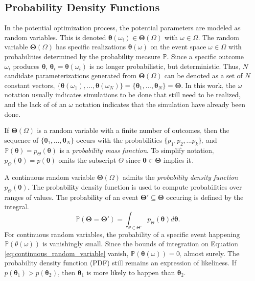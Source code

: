 \subsection{Probability Density Functions}

In the potential optimization process, the potential parameters are modeled as random variables.  This is denoted $\bm{\theta}(\omega_i) \in \bm{\Theta}(\Omega)$ with $\omega \in \Omega$.  The random variable $\bm{\Theta}(\Omega)$ has specific realizations $\bm{\theta}(\omega)$ on the event space $\omega \in \Omega$ with probabilities determined by the probability measure $\mathbb{P}$.
Since a specific outcome $\omega_i$ produces $\bm{\theta}$, $\bm{\theta}_i=\bm{\theta}(\omega_i)$ is no longer probabilistic, but deterministic.  Thus, $N$ candidate parameterizations generated from $\bm{\Theta}(\Omega)$ can be denoted as a set of $N$ constant vectors,
$
 \{\bm{\theta}(\omega_1),...,\bm{\theta}(\omega_N)\}
=\{\bm{\theta}_1,...,\bm{\theta}_N\}
=\bm{\Theta}
$.  In this work, the $\omega$ notation usually indicates simulations to be done that still need to be realized, and the lack of of an $\omega$ notation indicates that the simulation have already been done.

If $\bm{\Theta}(\Omega)$ is a random variable with a finite number of outcomes, then the sequence of $\{\bm{\theta}_1,...,\bm{\theta}_N\}$ occurs with the probabilities $\{p_1,p_2,...p_k\}$, and $\mathbb{P}(\bm{\theta})=p_{\Theta}(\bm{\theta})$ is a \emph{probability mass function}.
To simplify notation, $p_\Theta(\bm{\theta})=p(\bm{\theta})$ omits the subscript $\Theta$ since $\bm{\theta}\in\bm{\Theta}$ implies it.

A continuous random variable $\bm{\Theta}(\Omega)$ admits the \emph{probability density function} $p_{\Theta}(\bm{\theta})$. The probability density function is used to compute probabilities over ranges of values. The probability of an event $\bm{\Theta}' \subseteq \bm{\Theta}$ occuring is defined by the integral.
\begin{equation}
	\label{eq:continuous_random_variable}
  \mathbb{P}(\bm{\Theta}=\bm{\Theta}')
	=
	\int_{\theta \in \Theta'} p_{\Theta}(\bm{\theta}) d \bm{\theta}.
\end{equation}
For continuous random variables, the probability of a specific event happening $\mathbb{P}(\theta(\omega))$ is vanishingly small.  Since the bounds of integration on Equation \ref{eq:continuous_random_variable} vanish,  $\mathbb{P}(\bm{\theta}(\omega))=0$, almost surely.  The probability density function (PDF) still remains an expression of likeliness.
If $p(\bm{\theta}_1)>p(\bm{\theta}_2)$, then $\bm{\theta}_1$ is more likely to happen than $\bm{\theta}_2$.

